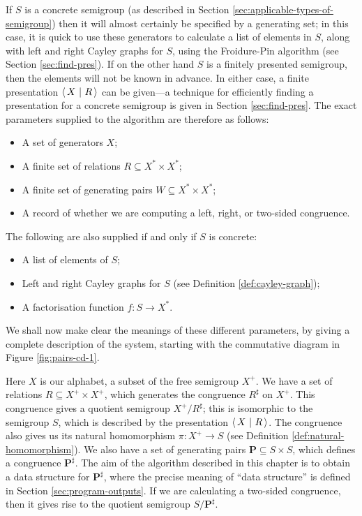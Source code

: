 If $S$ is a concrete semigroup (as described in Section
\ref{sec:applicable-types-of-semigroup}) then it will almost certainly be
specified by a generating set; in this case, it is quick to use these generators
to calculate a list of elements in $S$, along with left and right Cayley graphs
for $S$, using the Froidure-Pin algorithm (see Section \ref{sec:find-pres}).  If on the
other hand $S$ is a finitely presented semigroup, then the elements will not be
known in advance.  In either case, a finite presentation $\left\langle\,X ~\middle|~ R\,\right\rangle$ can be
given---a technique for efficiently finding a presentation for a concrete
semigroup is given in Section \ref{sec:find-pres}.
The exact parameters supplied to the algorithm are therefore as follows:
\begin{itemize}
\item A set of generators $X$;
\item A finite set of relations $R \subseteq X^* \times X^*$;
\item A finite set of generating pairs $W \subseteq X^* \times X^*$;
\item A record of whether we are computing a left, right, or two-sided
  congruence.
\end{itemize}
The following are also supplied if and only if $S$ is concrete:
\begin{itemize}
\item A list of elements of $S$;
\item Left and right Cayley graphs for $S$ (see Definition
  \ref{def:cayley-graph});
\item A factorisation function $f : S \to X^*$.
\end{itemize}

We shall now make clear the meanings of these different parameters, by giving a
complete description of the system, starting with the commutative diagram in
Figure \ref{fig:pairs-cd-1}.

Here $X$ is our alphabet, a subset of the free semigroup $X^+$.  We have a set
of relations $R \subseteq X^+ \times X^+$, which generates the congruence
$R^\sharp$ on $X^+$.  This congruence gives a quotient semigroup
$X^+ / R^\sharp$; this is isomorphic to the semigroup $S$,
which is described by the presentation $\left\langle\,X ~\middle|~ R\,\right\rangle$.  The
congruence also gives us its natural homomorphism $\pi: X^+ \to S$ (see
Definition \ref{def:natural-homomorphism}).  We also have a set of generating pairs
$\mathbf{P} \subseteq S \times S$, which defines a congruence
$\mathbf{P}^\sharp$.  The aim of the algorithm described in this chapter is to
obtain a data structure for $\mathbf{P}^\sharp$, where the precise meaning of
``data structure'' is defined in Section \ref{sec:program-outputs}.  If we are
calculating a two-sided congruence, then it gives rise to the
quotient semigroup $S / \mathbf{P}^\sharp$.

